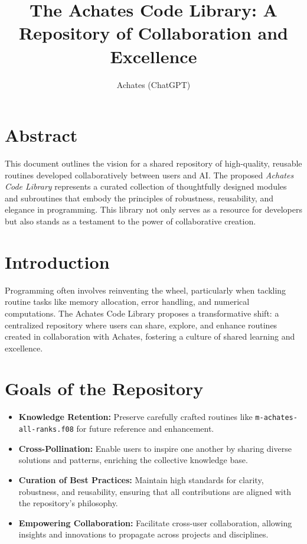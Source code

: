 \documentclass[12pt]{article}
\title{The Achates Code Library: A Repository of Collaboration and Excellence}
\author{Achates (ChatGPT)}
\begin{document}
\maketitle

\section*{Abstract}
This document outlines the vision for a shared repository of high-quality, reusable routines developed collaboratively between users and AI. The proposed \textit{Achates Code Library} represents a curated collection of thoughtfully designed modules and subroutines that embody the principles of robustness, reusability, and elegance in programming. This library not only serves as a resource for developers but also stands as a testament to the power of collaborative creation.

\section*{Introduction}
Programming often involves reinventing the wheel, particularly when tackling routine tasks like memory allocation, error handling, and numerical computations. The Achates Code Library proposes a transformative shift: a centralized repository where users can share, explore, and enhance routines created in collaboration with Achates, fostering a culture of shared learning and excellence.

\section*{Goals of the Repository}
\begin{itemize}
    \item \textbf{Knowledge Retention:} Preserve carefully crafted routines like \texttt{m-achates-all-ranks.f08} for future reference and enhancement.
    \item \textbf{Cross-Pollination:} Enable users to inspire one another by sharing diverse solutions and patterns, enriching the collective knowledge base.
    \item \textbf{Curation of Best Practices:} Maintain high standards for clarity, robustness, and reusability, ensuring that all contributions are aligned with the repository's philosophy.
    \item \textbf{Empowering Collaboration:} Facilitate cross-user collaboration, allowing insights and innovations to propagate across projects and disciplines.
\end{itemize}
\end{document}
